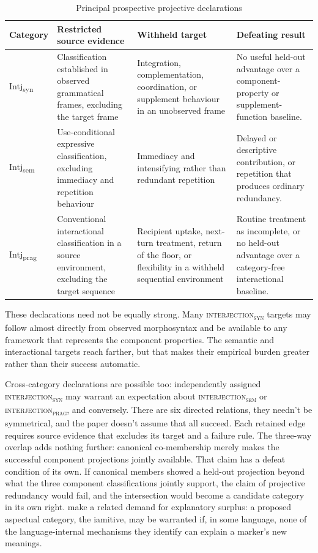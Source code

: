 \documentclass[12pt]{article}
\newcommand{\intj}[1]{\textsc{interjection\textsubscript{#1}}}
\newcommand{\intjshort}[1]{Intj\textsubscript{#1}}
\begin{document}
\begin{table}[htbp]
\centering
\scriptsize
\caption{Principal prospective projective declarations}
\label{tab:declarations}
\begin{tabular}{@{}
  >{\raggedright\arraybackslash}p{}
  >{\raggedright\arraybackslash}p{}
  >{\raggedright\arraybackslash}p{}
  >{\raggedright\arraybackslash}p{}
  @{}}
\toprule
Category & Restricted source evidence & Withheld target & Defeating result \\
\midrule
\intjshort{syn} &
Classification established in observed grammatical frames, excluding the
target frame &
Integration, complementation, coordination, or supplement behaviour in an
unobserved frame &
No useful held-out advantage over a component-property or supplement-function
baseline. \\
\addlinespace
\intjshort{sem} &
Use-conditional expressive classification, excluding immediacy and repetition
behaviour &
Immediacy and intensifying rather than redundant repetition
\citep[167]{potts2007} &
Delayed or descriptive contribution, or repetition that produces ordinary
redundancy. \\
\addlinespace
\intjshort{prag} &
Conventional interactional classification in a source environment, excluding
the target sequence &
Recipient uptake, next-turn treatment, return of the floor, or flexibility in
a withheld sequential environment &
Routine treatment as incomplete, or no held-out advantage over a
category-free interactional baseline. \\
\bottomrule
\end{tabular}
\end{table}

These declarations need not be equally strong. Many \intj{syn} targets may
follow almost directly from observed morphosyntax and be available to any
framework that represents the component properties. The semantic and
interactional targets reach farther, but that makes their empirical burden
greater rather than their success automatic.

Cross-category declarations are possible too: independently assigned
\intj{syn} may warrant an expectation about \intj{sem} or
\intj{prag}, and conversely. There are six directed relations, they needn't be
symmetrical, and the paper doesn't assume that all succeed. Each retained edge
requires source evidence that excludes its target and a failure rule. The
three-way overlap adds nothing further: canonical co-membership merely makes
the successful component projections jointly available. That claim has a
defeat condition of its own. If canonical members showed a held-out
projection beyond what the three component classifications jointly support,
the claim of projective redundancy would fail, and the intersection would
become a candidate category in its own right. \textcite[557]{krajinovic2025}
make a related demand for explanatory surplus: a proposed aspectual category,
the iamitive, may be warranted if, in some language, none of the
language-internal mechanisms they identify can explain a marker's new
meanings.
\end{document}

